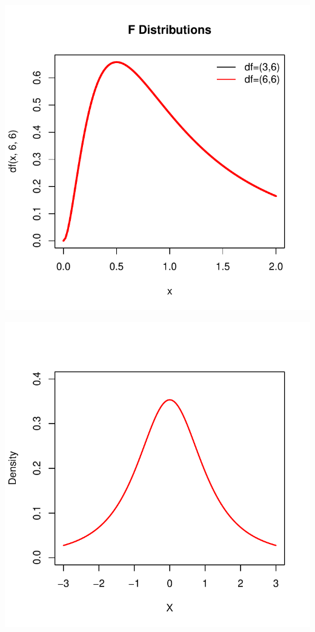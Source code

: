 \documentclass[]{book}
\theoremstyle{definition}
\theoremstyle{definition}
\theoremstyle{definition}
\theoremstyle{remark}
\begin{document}
\begin{center}\includegraphics{bookdown-demo_files/figure-latex/unnamed-chunk-57-2} \end{center}

\begin{center}\includegraphics{bookdown-demo_files/figure-latex/unnamed-chunk-58-1} \end{center}
\end{document}
